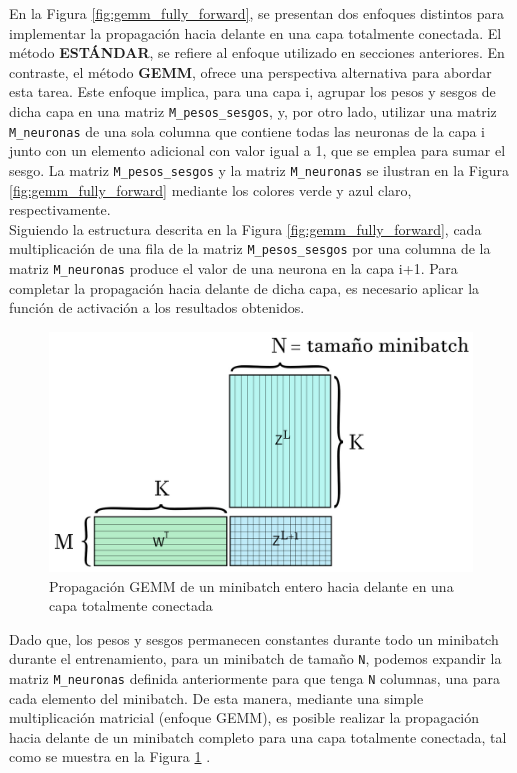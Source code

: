 En la Figura \ref{fig:gemm_fully_forward}, se presentan dos enfoques distintos para implementar la propagación hacia delante en una capa totalmente conectada. El método \textbf{ESTÁNDAR}, se refiere al enfoque utilizado en secciones anteriores. En contraste, el método \textbf{GEMM}, ofrece una perspectiva alternativa para abordar esta tarea. Este enfoque implica, para una capa i, agrupar los pesos y sesgos de dicha capa en una matriz \texttt{M\_pesos\_sesgos}, y, por otro lado, utilizar una matriz \texttt{M\_neuronas} de una sola columna que contiene todas las neuronas de la capa i junto con un elemento adicional con valor igual a 1, que se emplea para sumar el sesgo. La matriz \texttt{M\_pesos\_sesgos} y la matriz \texttt{M\_neuronas} se ilustran en la Figura \ref{fig:gemm_fully_forward} mediante los colores verde y azul claro, respectivamente. \\
Siguiendo la estructura descrita en la Figura \ref{fig:gemm_fully_forward}, cada multiplicación de una fila de la matriz \texttt{M\_pesos\_sesgos} por una columna de la matriz \texttt{M\_neuronas} produce el valor de una neurona en la capa i+1. Para completar la propagación hacia delante de dicha capa, es necesario aplicar la función de activación a los resultados obtenidos.

\begin{figure}[H]
	\centering
	\includegraphics[scale=0.25]{imagenes/gemm_fully_forward_minibatch.jpg}  
	\caption{Propagación GEMM de un minibatch entero hacia delante en una capa totalmente conectada}
	\label{fig:gemm_fully_forward_minibatch}
\end{figure}

Dado que, los pesos y sesgos permanecen constantes durante todo un minibatch durante el entrenamiento, para un minibatch de tamaño \texttt{N}, podemos expandir la matriz \texttt{M\_neuronas} definida anteriormente para que tenga \texttt{N} columnas, una para cada elemento del minibatch. De esta manera, mediante una simple multiplicación matricial (enfoque GEMM), es posible realizar la propagación hacia delante de un minibatch completo para una capa totalmente conectada, tal como se muestra en la Figura \ref{fig:gemm_fully_forward_minibatch} \cite{nvidia_back_fully_GEMM}.

